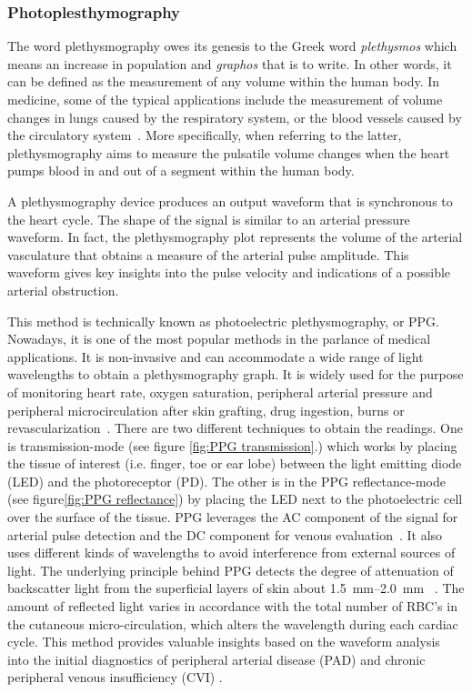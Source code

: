\subsubsection{Photoplesthymography}
\label{section literature PPG}
The word plethysmography owes its genesis to the Greek word \textit{plethysmos} which means an increase in population and \textit{graphos} that is to write. In other words, it can be defined as the measurement of any volume within the human body. In medicine, some of the typical applications include the measurement of volume changes in lungs caused by the respiratory system, or the blood vessels caused by the circulatory system~\cite{turcott2004methods}. More specifically, when referring to the latter, plethysmography aims to measure the pulsatile volume changes when the heart pumps blood in and out of a segment within the human body. 

A plethysmography device produces an output waveform that is synchronous to the heart cycle. The shape of the signal is similar to an arterial pressure waveform. In fact, the plethysmography plot represents the volume of the arterial vasculature that obtains a measure of the arterial pulse amplitude. This waveform gives key insights into the pulse velocity and indications of a possible arterial obstruction.

This method is technically known as photoelectric plethysmography, or PPG. Nowadays, it is one of the most popular methods in the parlance of medical applications. It is non-invasive and can accommodate a wide range of light wavelengths to obtain a plethysmography graph. It is widely used for the purpose of monitoring heart rate, oxygen saturation, peripheral arterial pressure and peripheral microcirculation after skin grafting, drug ingestion, burns or revascularization~\cite{holohan1996plethysmography}. There are two different techniques to obtain the readings. One is transmission-mode (see figure \ref{fig:PPG transmission}.) which works by placing the tissue of interest (i.e. finger, toe or ear lobe) between the light emitting diode (LED) and the photoreceptor (PD). The other is in the PPG reflectance-mode (see figure\ref{fig:PPG reflectance}) by placing the LED next to the photoelectric cell over the surface of the tissue. PPG leverages the AC component of the signal for arterial pulse detection and the DC component for venous evaluation~\cite{higgins1986photoplethysmographic}. It also uses different kinds of wavelengths to avoid interference from external sources of light. The underlying principle behind PPG detects the degree of attenuation of backscatter light from the superficial layers of skin about \SIrange{1.5}{2.0}{\milli\meter} ~\cite{holohan1996plethysmography,bashkatov2005optical,kim1986pulse}. The amount of reflected light varies in accordance with the total number of RBC's in the cutaneous micro-circulation, which alters the wavelength during each cardiac cycle. This method provides valuable insights based on the waveform analysis into the initial diagnostics of peripheral arterial disease (PAD) \cite{allen1993development, williams2005evaluation, alnaeb2007optical} and chronic peripheral venous insufficiency (CVI) \cite{eberhardt2005chronic,norris1983quantitative}.


